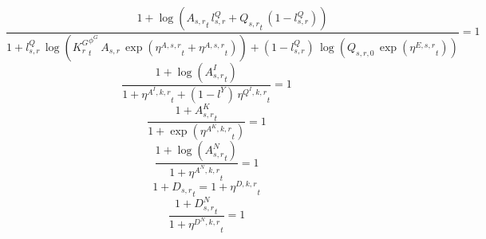 \noindent[name= `sector TFP 3 1']
\begin{dmath}
\frac{1+\log\left({{A_{s,r}}}_{t}\, {{l^{Q}_{s,r}}}+{{Q_{s,r}}}_{t}\, \left(1-{{l^{Q}_{s,r}}}\right)\right)}{1+{{l^{Q}_{s,r}}}\, \log\left({{K^G_{r}}}_{t}^{{{\phi^{G}}}}\, {{A_{s,r}}}\, \exp\left({{\eta^{A,s,r}}}_{t}+{{\eta^{A,s,r}}}_{t}\right)\right)+\left(1-{{l^{Q}_{s,r}}}\right)\, \log\left({{Q_{s,r,0}}}\, \exp\left({{\eta^{E,s,r}}}_{t}\right)\right)}=1
\end{dmath}
\noindent[name= `intermediate input productivity 3 1']
\begin{dmath}
\frac{1+\log\left({{A^{I}_{s,r}}}_{t}\right)}{1+{{\eta^{A^{I},k,r}}}_{t}+\left(1-{{l^{Y}}}\right)\, {{\eta^{Q^{I},k,r}}}_{t}}=1
\end{dmath}
\noindent[name= `capital productivity shock 3 1']
\begin{dmath}
\frac{1+{{A^{K}_{s,r}}}_{t}}{1+\exp\left({{\eta^{A^{K},k,r}}}_{t}\right)}=1
\end{dmath}
\noindent[name= `labour productivity shock 3 1']
\begin{dmath}
\frac{1+\log\left({{A^{N}_{s,r}}}_{t}\right)}{1+{{\eta^{A^{N},k,r}}}_{t}}=1
\end{dmath}
\noindent[name= `TFP damage 3 1']
\begin{dmath}
1+{{D_{s,r}}}_{t}=1+{{\eta^{D,k,r}}}_{t}
\end{dmath}
\noindent[name= `labour damage 3 1']
\begin{dmath}
\frac{1+{{D^N_{s,r}}}_{t}}{1+{{\eta^{D^{N},k,r}}}_{t}}=1
\end{dmath}
\noindent[name= `capital damage 3 1']
